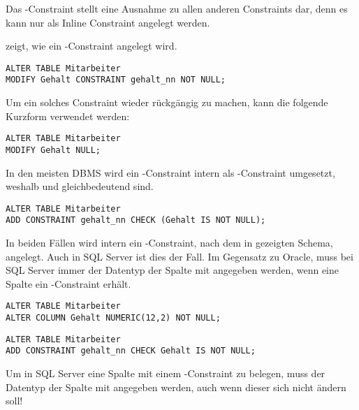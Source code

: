         \begin{merke}
          Das \NOTNULL-Constraint stellt eine Ausnahme zu allen anderen Constraints dar, denn es kann nur als Inline Constraint angelegt werden.
        \end{merke}
         zeigt, wie ein \NOTNULL-Constraint angelegt wird.
        \begin{lstlisting}[language=oracle_sql,caption={Ein \NOTNULL-Constraint anlegen in Oracle},label=sql09_05]
ALTER TABLE Mitarbeiter
MODIFY Gehalt CONSTRAINT gehalt_nn NOT NULL;
        \end{lstlisting}
        Um ein solches Constraint wieder rückgängig zu machen, kann die folgende Kurzform verwendet werden:
        \begin{lstlisting}[language=oracle_sql,caption={Das Gegenteil von \NOTNULL},label=sql09_06]
ALTER TABLE Mitarbeiter
MODIFY Gehalt NULL;
        \end{lstlisting}
        In den meisten DBMS wird ein \NOTNULL-Constraint intern als
\CHECK-Constraint umgesetzt, weshalb  und
 gleichbedeutend sind.
        \begin{lstlisting}[language=oracle_sql,caption={Die alternative Form eines \NOTNULL-Constraints in Oracle},label=sql09_07]
ALTER TABLE Mitarbeiter
ADD CONSTRAINT gehalt_nn CHECK (Gehalt IS NOT NULL);
        \end{lstlisting}
        In beiden Fällen wird intern ein \CHECK-Constraint, nach dem in  gezeigten Schema, angelegt. Auch in SQL Server ist dies der Fall. Im Gegensatz zu Oracle, muss bei SQL Server immer der Datentyp der Spalte mit angegeben werden, wenn eine Spalte ein \NOTNULL-Constraint erhält.
        \begin{lstlisting}[language=ms_sql,caption={Ein \NOTNULL{} Constraint
anlegen in SQL Server},label=sql09_08]
ALTER TABLE Mitarbeiter
ALTER COLUMN Gehalt NUMERIC(12,2) NOT NULL;
        \end{lstlisting}
        \begin{lstlisting}[language=ms_sql,caption={Die alternative Form eines
\NOTNULL{} Constraints in SQL Server},label=sql09_09]
ALTER TABLE Mitarbeiter
ADD CONSTRAINT gehalt_nn CHECK Gehalt IS NOT NULL;
        \end{lstlisting}
        \begin{merke}
          Um in SQL Server eine Spalte mit einem \NOTNULL-Constraint zu belegen, muss der Datentyp der Spalte mit angegeben werden, auch wenn dieser sich nicht ändern soll!
        \end{merke}
